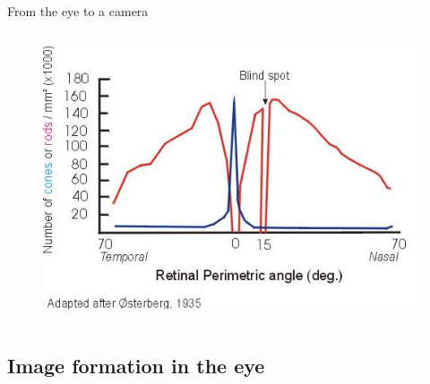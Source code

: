 \documentclass{beamer}
\begin{document}
\begin{frame}
\begin{block}{From the eye to a camera}
\begin{columns}
\begin{column}{.5\linewidth}
{\begin{figure}
            \includegraphics[width=.9\textwidth]{./images/distri.jpg}
          \end{figure}}
      \end{column}
    \end{columns}    
  \end{block}
\end{frame}

\subsection{Image formation in the eye}
\end{document}
